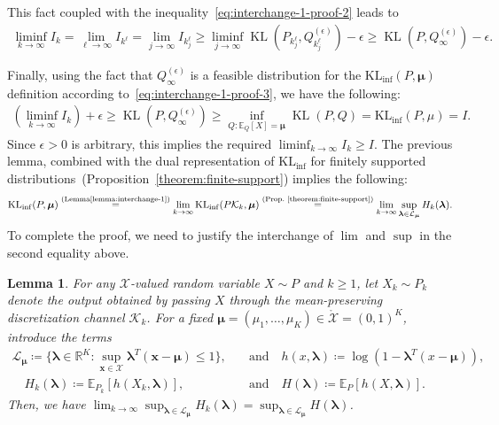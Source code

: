 \documentclass{article}
\theoremstyle{plain}
\newtheorem{lemma}[lemma]{Lemma}
\theoremstyle{definition}
\newcommand{\KLinf}{\operatorname{KL_{inf}}}
\newcommand{\KL}{\operatorname{KL}}
\newcommand{\R}{\mathbb{R}}
\newcommand{\calX}{\mathcal X}
\newcommand{\calL}{\mathcal L}
\newcommand{\calK}{\mathcal{K}}
\newcommand{\xvec}{\mathbf{x}}
\newcommand{\qtext}[1]{\quad \text{#1} \quad}
\newcommand{\Qepsilon}{Q^{(\epsilon)}}
\newcommand{\boldlambda}{\boldsymbol{\lambda}}
\newcommand{\boldmu}{\boldsymbol{\mu}}
\newcommand{\dualdomain}{\calL_{\boldmu}}
\begin{document}
This fact coupled with the inequality~\eqref{eq:interchange-1-proof-2} leads to 
\begin{align}
    \liminf_{k \to \infty} I_k = \lim_{\ell \to \infty}  I_{k^\ell} = \lim_{j \to \infty}I_{k_j^\ell} \geq \liminf_{j \to \infty} \KL(P_{k_j^\ell}, \Qepsilon_{k^\ell_j}) - \epsilon  \geq \KL(P, \Qepsilon_\infty) - \epsilon. 
\end{align}

Finally, using the fact that $Q_\infty^{(\epsilon)}$ is a feasible distribution for the $\KLinf(P, \boldmu)$ definition according to~\eqref{eq:interchange-1-proof-3}, we have the following: 
\begin{align}
    \left( \liminf_{k \to \infty} I_k \right) + \epsilon \geq \KL(P, \Qepsilon_\infty) \geq \inf_{Q: \mathbb{E}_Q[X]=\boldmu} \KL(P, Q) = \KLinf(P, \mu) = I. 
\end{align}
Since $\epsilon>0$ is arbitrary, this implies the required $\liminf_{k \to \infty} I_k \geq I$. 
\hfill \qedsymbol
The previous lemma, combined with the dual representation of $\KLinf$ for finitely supported distributions~(Proposition~\ref{theorem:finite-support}) implies the following: 
\begin{align}
    \KLinf(P, \boldmu) \stackrel{\text{(Lemma\ref{lemma:interchange-1})}}{=} \lim_{k \to \infty}  \KLinf(P\calK_k, \boldmu) \stackrel{\text{(Prop.~\ref{theorem:finite-support})}}{=} \lim_{k \to \infty} \sup_{\boldlambda \in \dualdomain} H_k(\boldlambda). 
\end{align}
To complete the proof, we need to justify the interchange of $\lim$ and $\sup$ in the second equality above. 
\begin{lemma}
    \label{lemma:interchange-2}
    For any $\calX$-valued random variable $X \sim P$ and $k \geq 1$,  let $X_k \sim P_k$ denote the output obtained by  passing $X$ through the mean-preserving discretization channel $\calK_k$. For a fixed $\boldmu = (\mu_1,\ldots, \mu_K) \in \mathring{\calX} = (0, 1)^K$, introduce the terms 
    \begin{align}
        \calL_{\boldmu} \coloneqq \{ \boldlambda \in \R^K: \sup_{\xvec \in \calX} \boldlambda^T(\xvec - \boldmu) \leq 1 \}, & \qtext{and} h(x, \boldlambda)  \coloneqq \log(1 - \boldlambda^T(x - \boldmu)),  \\
    \quad 
        H_k(\boldlambda) \coloneqq \mathbb{E}_{P_k}[h(X_k, \boldlambda)], &\qtext{and} H(\boldlambda) \coloneqq \mathbb{E}_P[h(X, \boldlambda)]. 
    \end{align}
    Then, we have $\lim_{k \to \infty} \sup_{\boldlambda \in \calL_{\boldmu}} H_k(\boldlambda) = \sup_{\boldlambda\in \calL_{\boldmu}} H(\boldlambda)$. 
\end{lemma}
\end{document}
